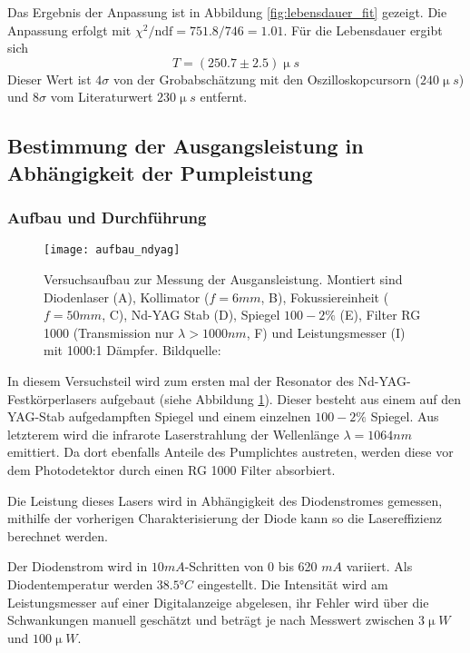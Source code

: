 \documentclass{../Misc/MontavonLaTeX/Montavon}
\newcommand{\fullwidth}{1.0\textwidth}
\begin{document}
Das Ergebnis der Anpassung ist in Abbildung \ref{fig:lebensdauer_fit} gezeigt. Die Anpassung erfolgt mit $\chi^2 / \textrm{ndf} = 751.8 / 746 = 1.01$. Für die Lebensdauer ergibt sich
\[
	T = (250.7 \pm 2.5) \unit{\upmu s}
\]
Dieser Wert ist $4 \sigma$ von der Grobabschätzung mit den Oszilloskopcursorn ($240 \unit{\upmu s}$) und $8 \sigma$ vom Literaturwert $230 \unit{\upmu s}$ entfernt.

\subsection{Bestimmung der Ausgangsleistung in Abhängigkeit der Pumpleistung}
\subsubsection{Aufbau und Durchführung}
\begin{figure}[htbp]
\centering
\texttt{[image: aufbau\_ndyag]}
\caption{Versuchsaufbau zur Messung der Ausgansleistung. Montiert sind Diodenlaser (A), Kollimator ($f = 6 \unit{mm}$, B), Fokussiereinheit ($f = 50 \unit{mm}$, C), Nd-YAG Stab (D), Spiegel $100-2 \unit{\%}$ (E), Filter RG 1000 (Transmission nur $\lambda > 1000 \unit{nm}$, F) und Leistungsmesser (I) mit 1000:1 Dämpfer. Bildquelle: \cite[S. 36]{anleitung1}}
\label{fig:aufbau_ndyag}
\end{figure}

In diesem Versuchsteil wird zum ersten mal der Resonator des Nd-YAG-Festkörperlasers aufgebaut (siehe Abbildung \ref{fig:aufbau_ndyag}). Dieser besteht aus einem auf den YAG-Stab aufgedampften Spiegel und einem einzelnen $100 - 2 \unit{\%}$ Spiegel. Aus letzterem wird die infrarote Laserstrahlung der Wellenlänge $\lambda = 1064 \unit{nm}$ emittiert. Da dort ebenfalls Anteile des Pumplichtes austreten, werden diese vor dem Photodetektor durch einen RG 1000 Filter absorbiert.

Die Leistung dieses Lasers wird in Abhängigkeit des Diodenstromes gemessen, mithilfe der vorherigen Charakterisierung der Diode kann so die Lasereffizienz berechnet werden.

Der Diodenstrom wird in $10 \unit{mA}$-Schritten von 0 bis 620 $\unit{mA}$ variiert. Als Diodentemperatur werden $38.5 \unit{\degree C}$ eingestellt.
Die Intensität wird am Leistungsmesser auf einer Digitalanzeige abgelesen, ihr Fehler wird über die Schwankungen manuell geschätzt und beträgt je nach Messwert zwischen $3 \unit{\upmu W}$ und $100 \unit{\upmu W}$.
\end{document}
